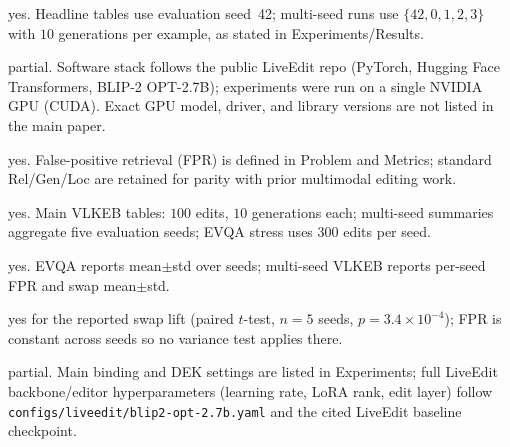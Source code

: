 \documentclass[letterpaper]{article}
\begin{document}
\begin{itemize}
\begin{itemize}
	yes. Headline tables use evaluation seed~42; multi-seed runs use $\{42,0,1,2,3\}$ with $10$ generations per example, as stated in Experiments/Results.

	partial. Software stack follows the public LiveEdit repo (PyTorch, Hugging Face Transformers, BLIP-2 OPT-2.7B); experiments were run on a single NVIDIA GPU (CUDA). Exact GPU model, driver, and library versions are not listed in the main paper.

	yes. False-positive retrieval (FPR) is defined in Problem and Metrics; standard Rel/Gen/Loc are retained for parity with prior multimodal editing work.

	yes. Main VLKEB tables: $100$ edits, $10$ generations each; multi-seed summaries aggregate five evaluation seeds; EVQA stress uses $300$ edits per seed.

	yes. EVQA reports mean$\pm$std over seeds; multi-seed VLKEB reports per-seed FPR and swap mean$\pm$std.

	yes for the reported swap lift (paired $t$-test, $n{=}5$ seeds, $p{=}3.4{\times}10^{-4}$); FPR is constant across seeds so no variance test applies there.

	partial. Main binding and DEK settings are listed in Experiments; full LiveEdit backbone/editor hyperparameters (learning rate, LoRA rank, edit layer) follow \texttt{configs/liveedit/blip2-opt-2.7b.yaml} and the cited LiveEdit baseline checkpoint.


\end{itemize}
\end{itemize}
\ifreproStandalone

\end{document}
